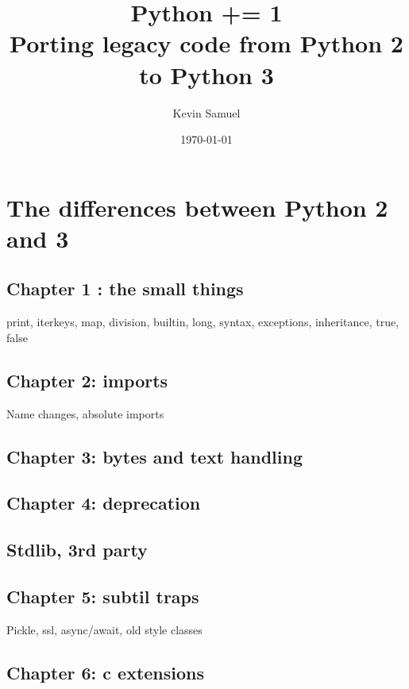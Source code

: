 \documentclass[a4paper, 12pt]{book}
\title{%
  Python += 1 \\
  \large Porting legacy code from Python 2 to Python 3
}
\author{Kevin Samuel}
\date{\today}
\begin{document}
\maketitle

\frontmatter

\tableofcontents



\mainmatter

\part{The differences between Python 2 and 3}



\chapter{Chapter 1 : the small things}

print, iterkeys, map, division, builtin, long, syntax,  exceptions, inheritance, true, false

\chapter{Chapter 2: imports}

Name changes, absolute imports

\chapter{Chapter 3: bytes and text handling}

\chapter{Chapter 4: deprecation}

\chapter{Stdlib, 3rd party}

\chapter{Chapter 5: subtil traps}

Pickle, ssl, async/await, old style classes

\chapter{Chapter 6:  c extensions}
\end{document}
